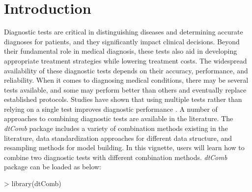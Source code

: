 \documentclass[10pt]{article}
\newcommand{\dtComb}{\textit{dtComb}}
\begin{document}
\section{Introduction}
Diagnostic tests are critical in distinguishing diseases and determining accurate diagnoses for patients, and they significantly impact clinical decisions. Beyond their fundamental role in medical diagnosis, these tests also aid in developing appropriate treatment strategies while lowering treatment costs. The widespread availability of these diagnostic tests depends on their accuracy, performance, and reliability. When it comes to diagnosing medical conditions, there may be several tests available, and some may perform better than others and eventually replace established protocols. Studies have shown that using multiple tests rather than relying on a single test improves diagnostic performance \citep{amini2019application, yu2019covariate, aznar2021incorporating}. A number of approaches to combining diagnostic tests are available in the literature. The \dtComb{} package includes a variety of combination methods existing in the literature, data standardization approaches for different data structure, and resampling methods for model building. 
In this vignette, users will learn how to combine two diagnostic tests with different combination methods. \dtComb{} package can be loaded as below: 
\begin{Schunk}
\begin{Sinput}
> library(dtComb)
\end{Sinput}
\end{Schunk}
\end{document}
